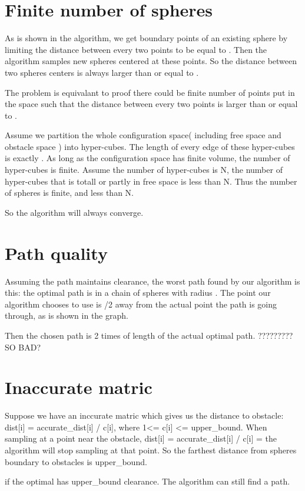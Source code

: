 \documentclass[11pt]{article}
\begin{document}
 \section{Finite number of spheres}
 \label{Finite number of spheres}
 As is shown in the algorithm, we get boundary points of an existing sphere by limiting the distance between every two points to be equal to \delta. Then the algorithm samples new spheres centered at these points. So the distance between two spheres centers is always larger than or equal to \delta. 

 The problem is equivalant to proof there could be finite number of points put in the space such that the distance between every two points is larger than or equal to \delta.

 Assume we partition the whole configuration space( including free space and obstacle space ) into hyper-cubes. The length of every edge of these hyper-cubes is exactly \delta. As long as the configuration space has finite volume, the number of hyper-cubes is finite. Assume the number of hyper-cubes is N, the number of hyper-cubes that is totall or partly in free space is less than N. Thus the number of spheres is finite, and less than N.

 So the algorithm will always converge.

 \section{Path quality}
 \label{Path quality}
 Assuming the path maintains \delta clearance, the worst path found by our algorithm is this: the optimal path is in a chain of spheres with radius \delta. The point our algorithm chooses to use is \delta/2 away from the actual point the path is going through, as is shown in the graph.

 Then the chosen path is 2 times of length of the actual optimal path. ????????? SO BAD?

 \section{Inaccurate matric}
 \label{Inaccurate matric}
 Suppose we have an inccurate matric which gives us the distance to obstacle:
 dist[i] = accurate_dist[i] / c[i], where 1<= c[i] <= upper_bound. When sampling at a point near the obstacle, dist[i] = accurate_dist[i] / c[i] = \delta the algorithm will stop sampling at that point. So the farthest distance from spheres boundary to obstacles is \delta * upper_bound. 

 if the optimal has \delta * upper_bound clearance. The algorithm can still find a path.

 
\end{document}
